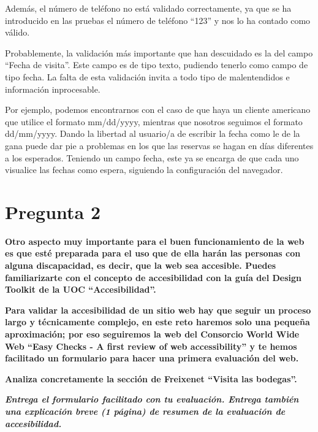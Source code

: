 \documentclass[spanish]{article}
\begin{document}
Además, el número de teléfono no está validado correctamente, ya que se ha
introducido en las pruebas el número de teléfono ``123'' y nos lo ha contado
como válido.\newline

Probablemente, la validación más importante que han descuidado es la del campo
``Fecha de visita''. Este campo es de tipo texto, pudiendo tenerlo como campo de
tipo fecha. La falta de esta validación invita a todo tipo de malentendidos e
información inprocesable.\newline

Por ejemplo, podemos encontrarnos con el caso de que haya un cliente americano
que utilice el formato mm/dd/yyyy, mientras que nosotros seguimos el formato
dd/mm/yyyy. Dando la libertad al usuario/a de escribir la fecha como le de la
gana puede dar pie a problemas en los que las reservas se hagan en días
diferentes a los esperados. Teniendo un campo fecha, este ya se encarga de que
cada uno visualice las fechas como espera, siguiendo la configuración del
navegador.\newline

\newpage

\section{Pregunta 2}

\textbf{Otro aspecto muy importante para el buen funcionamiento de la web es que
esté preparada para el uso que de ella harán las personas con alguna
discapacidad, es decir, que la web sea accesible. Puedes familiarizarte con el
concepto de accesibilidad con la guía del Design Toolkit de la UOC
``Accesibilidad''.}\newline

\textbf{Para validar la accesibilidad de un sitio web hay que seguir un proceso
largo y técnicamente complejo, en este reto haremos solo una pequeña
aproximación; por eso seguiremos la web del Consorcio World Wide Web ``Easy
Checks - A first review of web accessibility'' y te hemos facilitado un
formulario para hacer una primera evaluación del web.}\newline

\textbf{Analiza concretamente la sección de Freixenet ``Visita las
bodegas''.}\newline

\textbf{\textit{Entrega el formulario facilitado con tu evaluación. Entrega
también una explicación breve (1 página) de resumen de la evaluación de
accesibilidad.}}
\end{document}
